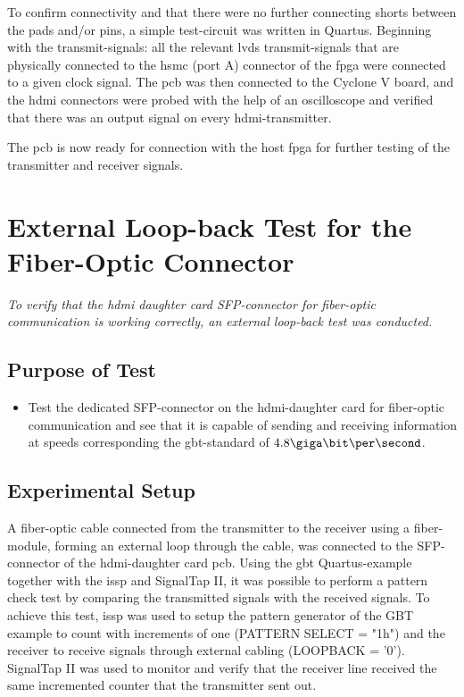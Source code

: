 \documentclass[main.tex]{subfiles}
\begin{document}
To confirm connectivity and that there were no further connecting shorts between the pads and/or pins, a simple test-circuit was written in Quartus. Beginning with the transmit-signals: all the relevant \gls{lvds} transmit-signals that are physically connected to the \gls{hsmc} (port A) connector of the \gls{fpga} were connected to a given clock signal. The \gls{pcb} was then connected to the Cyclone V board, and the \gls{hdmi} connectors were probed with the help of an oscilloscope and verified that there was an output signal on every \gls{hdmi}-transmitter. 

The \gls{pcb} is now ready for connection with the host \gls{fpga} for further testing of the transmitter and receiver signals. 

\section{External Loop-back Test for the Fiber-Optic Connector} \label{sec:exlooptest}

\textit{To verify that the \gls{hdmi} daughter card SFP-connector for fiber-optic communication is working correctly, an external loop-back test was conducted.}

\subsection{Purpose of Test}
\begin{itemize}\setlength{\itemsep}{10pt}

\item Test the dedicated SFP-connector on the \gls{hdmi}-daughter card for fiber-optic communication and see that it is capable of sending and receiving information at speeds corresponding the \gls{gbt}-standard of $4.8 \giga\bit\per\second$. 
\end{itemize}

\subsection{Experimental Setup}
A fiber-optic cable connected from the transmitter to the receiver using a fiber-module, forming an external loop through the cable, was connected to the SFP-connector of the \gls{hdmi}-daughter card \gls{pcb}. Using the \gls{gbt} Quartus-example together with the \gls{issp} and SignalTap II, it was possible to perform a pattern check test by comparing the transmitted signals with the received signals. To achieve this test, \gls{issp} was used to setup the pattern generator of the GBT example to count with increments of one (PATTERN SELECT = "1h") and the receiver to receive signals through external cabling (LOOPBACK = '0'). SignalTap II was used to monitor and verify that the receiver line received the same incremented counter that the transmitter sent out.
\end{document}
